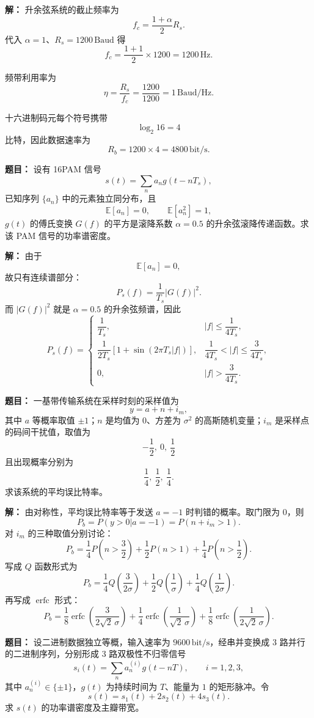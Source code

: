 \par\textbf{解：}
升余弦系统的截止频率为
\[
f_c=\frac{1+\alpha}{2}R_s.
\]
代入 $\alpha=1$、$R_s=1200\,\mathrm{Baud}$ 得
\[
f_c=\frac{1+1}{2}\times 1200=1200\,\mathrm{Hz}.
\]

频带利用率为
\[
\eta=\frac{R_s}{f_c}=\frac{1200}{1200}=1\,\mathrm{Baud/Hz}.
\]

十六进制码元每个符号携带
\[
\log_2 16=4
\]
比特，因此数据速率为
\[
R_b=1200\times 4=4800\,\mathrm{bit/s}.
\]

\medskip
{}
\textbf{题目：}
设有 16PAM 信号
\[
s(t)=\sum_n a_n g(t-nT_s),
\]
已知序列 $\{a_n\}$ 中的元素独立同分布，且
\[
\mathbb{E}[a_n]=0,\qquad \mathbb{E}[a_n^2]=1,
\]
$g(t)$ 的傅氏变换 $G(f)$ 的平方是滚降系数 $\alpha=0.5$ 的升余弦滚降传递函数。求该 PAM 信号的功率谱密度。

\par\textbf{解：}
由于
\[
\mathbb{E}[a_n]=0,
\]
故只有连续谱部分：
\[
P_s(f)=\frac{1}{T_s}|G(f)|^2.
\]
而 $|G(f)|^2$ 就是 $\alpha=0.5$ 的升余弦频谱，因此
\[
P_s(f)=
\begin{cases}
\dfrac{1}{T_s}, & |f|\le \dfrac{1}{4T_s},\\[8pt]
\dfrac{1}{2T_s}\left[1+\sin\!\left(2\pi T_s|f|\right)\right],
& \dfrac{1}{4T_s}<|f|\le \dfrac{3}{4T_s},\\[10pt]
0, & |f|>\dfrac{3}{4T_s}.
\end{cases}
\]

\medskip
{}
\textbf{题目：}
一基带传输系统在采样时刻的采样值为
\[
y=a+n+i_m,
\]
其中 $a$ 等概率取值 $\pm1$；$n$ 是均值为 $0$、方差为 $\sigma^2$ 的高斯随机变量；$i_m$ 是采样点的码间干扰值，取值为
\[
-\frac12,\ 0,\ \frac12
\]
且出现概率分别为
\[
\frac14,\ \frac12,\ \frac14.
\]
求该系统的平均误比特率。

\par\textbf{解：}
由对称性，平均误比特率等于发送 $a=-1$ 时判错的概率。取门限为 $0$，则
\[
P_b=P(y>0|a=-1)=P(n+i_m>1).
\]
对 $i_m$ 的三种取值分别讨论：
\[
P_b=\frac14P\!\left(n>\frac32\right)
+\frac12P(n>1)
+\frac14P\!\left(n>\frac12\right).
\]
写成 $Q$ 函数形式为
\[
P_b=\frac14Q\!\left(\frac{3}{2\sigma}\right)
+\frac12Q\!\left(\frac{1}{\sigma}\right)
+\frac14Q\!\left(\frac{1}{2\sigma}\right).
\]
再写成 $\operatorname{erfc}$ 形式：
\[
P_b=
\frac18\operatorname{erfc}\!\left(\frac{3}{2\sqrt2\,\sigma}\right)
+\frac14\operatorname{erfc}\!\left(\frac{1}{\sqrt2\,\sigma}\right)
+\frac18\operatorname{erfc}\!\left(\frac{1}{2\sqrt2\,\sigma}\right).
\]

\medskip
{}
\textbf{题目：}
设二进制数据独立等概，输入速率为 $9600\,\mathrm{bit/s}$，经串并变换成 3 路并行的二进制序列，分别形成 3 路双极性不归零信号
\[
s_i(t)=\sum_n a_n^{(i)}g(t-nT),\qquad i=1,2,3,
\]
其中 $a_n^{(i)}\in\{\pm1\}$，$g(t)$ 为持续时间为 $T$、能量为 $1$ 的矩形脉冲。令
\[
s(t)=s_1(t)+2s_2(t)+4s_3(t).
\]
求 $s(t)$ 的功率谱密度及主瓣带宽。


